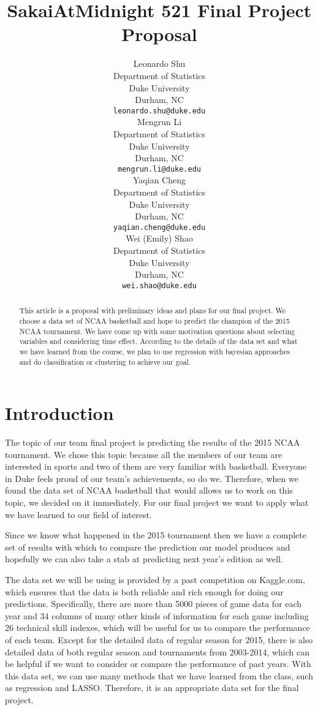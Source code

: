 \documentclass{article} %
\title{SakaiAtMidnight 521 Final Project Proposal}
\author{
Leonardo Shu\\
Department of Statistics\\
Duke University\\
Durham, NC \\
\texttt{leonardo.shu@duke.edu} \\
\And
Mengrun Li \\
Department of Statistics\\
Duke University\\
Durham, NC \\
\texttt{mengrun.li@duke.edu} \\
\AND
Yaqian Cheng \\
Department of Statistics\\
Duke University\\
Durham, NC \\
\texttt{yaqian.cheng@duke.edu} \\
\And
Wei (Emily) Shao \\
Department of Statistics\\
Duke University\\
Durham, NC \\
\texttt{wei.shao@duke.edu} \\
}
\begin{document}
\maketitle

\begin{abstract}
This article is a proposal with preliminary ideas and plans for our final project. We choose a data set of NCAA basketball and hope to predict the champion of the 2015 NCAA tournament. We have come up with some motivation questions about selecting variables and considering time effect. According to the details of the data set and what we have learned from the course, we plan to use regression with bayesian approaches and do classification or clustering to achieve our goal.
\end{abstract}

\section{Introduction}

The topic of our team final project is predicting the results of the 2015 NCAA tournament. We chose this topic because all the members of our team are interested in sports and two of them are very familiar with basketball. Everyone in Duke feels proud of our team's achievements, so do we. Therefore, when we found the data set of NCAA basketball that would allows us to work on this topic, we decided on it immediately. For our final project we want to apply what we have learned to our field of interest.

Since we know what happened in the 2015 tournament then we have a complete set of results with which to compare the prediction our model produces and hopefully we can also take a stab at predicting next year's edition as well.

The data set we will be using is provided by a past competition on Kaggle.com, which ensures that the data is both reliable and rich enough for doing our predictions. Specifically, there are more than 5000 pieces of game data for each year and 34 columns of many other kinds of information for each game including 26 technical skill indexes, which will be useful for us to compare the performance of each team. Except for the detailed data of regular season for 2015, there is also detailed data of both regular season and tournaments from 2003-2014, which can be helpful if we want to consider or compare the performance of past years. With this data set, we can use many methods that we have learned from the class, such as regression and LASSO. Therefore, it is an appropriate data set for the final project.
\end{document}
